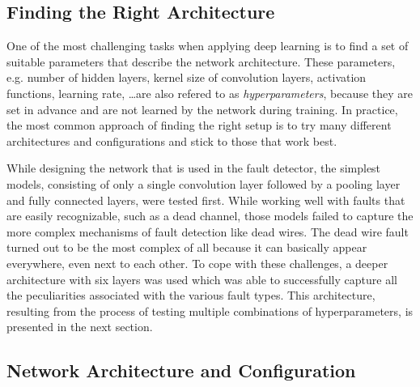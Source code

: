 \subsection{Finding the Right Architecture}

One of the most challenging tasks when applying deep learning is to
find a set of suitable parameters that describe the network
architecture. These parameters, e.g. number of hidden layers, kernel
size of convolution layers, activation functions, learning rate,
\ldots are also refered to as \textit{hyperparameters}, because they
are set in advance and are not learned by the network during training.
In practice, the most common approach of finding the right
setup is to try many different architectures and configurations
and stick to those that work best.

While designing the network that is used in the fault detector, the
simplest models, consisting of only a single convolution layer
followed by a pooling layer and fully connected layers, were tested
first. While working well with faults that are easily recognizable,
such as a dead channel, those models failed to capture the more
complex mechanisms of fault detection like dead wires. The dead wire
fault turned out to be the most complex of all because it
can basically appear everywhere, even next to each other. To cope with
these challenges, a deeper
architecture with six layers was used which was able to successfully
capture all the peculiarities associated with the various fault
types. This architecture, resulting from the process of testing
multiple combinations of hyperparameters, is presented in the next
section.

\subsection{Network Architecture and Configuration}

